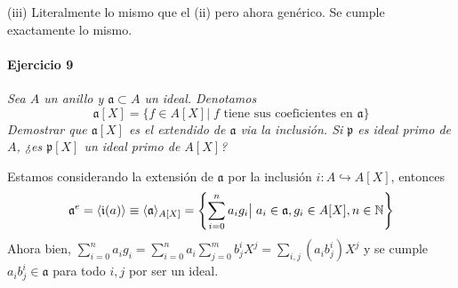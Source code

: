 \documentclass[../main.tex]{subfiles}
\begin{document}
(iii) Literalmente lo mismo que el (ii) pero ahora genérico. Se cumple exactamente lo mismo.



\paragraph{Ejercicio 9} \textit{Sea $A$ un anillo y $\mathfrak a \subset A$ un ideal. Denotamos
\[\mathfrak a [X] = \{ f \in A[X] \vert \; f \text{ tiene sus coeficientes en } \mathfrak a\}\]
Demostrar que $\mathfrak a[X]$ es el extendido de $\mathfrak a$ via la inclusión. Si $\mathfrak p$ es ideal primo de $A$, ¿es $\mathfrak p[X]$ un ideal primo de $A[X]$?}

Estamos considerando la extensión de $\mathfrak a$ por la inclusión $i:A\hookrightarrow A[X]$, entonces
$$
\mathfrak a^e = \langle \mathfrak i(a) \rangle \equiv \langle \mathfrak a\rangle_{A[X]} = \left\{\sum_{i=0}^n a_i g_i\big \vert\; a_i \in \mathfrak a, g_i \in A[X],n\in \mathbb{N}   \right\}
$$
Ahora bien, $\sum_{i=0}^n a_i g_i = \sum_{i=0}^n a_i \sum_{j=0}^m b^i_j X^j = \sum_{i,j}(a_ib^i_j) X^j$ y se cumple  $a_ib^i_j \in  \mathfrak a$ para todo $i,j$ por ser un ideal.

%
%
%
%
%
%
%
\end{document}
